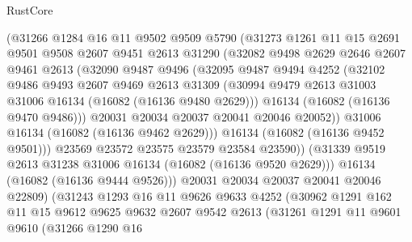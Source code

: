 \begin{lexlean}{RustCore}
\begin{coremodule}
                (@31266
                  @1284
                  @16
                  @11
                  @9502
                  @9509
                  @5790
                  (@31273
                    @1261
                    @11
                    @15
                    @2691
                    @9501
                    @9508
                    @2607
                    @9451
                    @2613
                    @31290
                    (@32082
                      @9498
                      @2629
                      @2646
                      @2607
                      @9461
                      @2613
                      (@32090
                        @9487
                        @9496
                        (@32095
                          @9487
                          @9494
                          @4252
                          (@32102
                            @9486
                            @9493
                            @2607
                            @9469
                            @2613
                            @31309
                            (@30994 @9479 @2613 @31003 @31006 @16134 (@16082 (@16136 @9480 @2629)))
                            @16134
                            (@16082 (@16136 @9470 @9486)))
                          @20031
                          @20034
                          @20037
                          @20041
                          @20046
                          @20052))
                      @31006
                      @16134
                      (@16082 (@16136 @9462 @2629)))
                    @16134
                    (@16082 (@16136 @9452 @9501)))
                  @23569
                  @23572
                  @23575
                  @23579
                  @23584
                  @23590))
              (@31339 @9519 @2613 @31238 @31006 @16134 (@16082 (@16136 @9520 @2629)))
              @16134
              (@16082 (@16136 @9444 @9526)))
            @20031
            @20034
            @20037
            @20041
            @20046
            @22809)
          (@31243
            @1293
            @16
            @11
            @9626
            @9633
            @4252
            (@30962
              @1291
              @162
              @11
              @15
              @9612
              @9625
              @9632
              @2607
              @9542
              @2613
              (@31261
                @1291
                @11
                @9601
                @9610
                (@31266
                  @1290
                  @16

\end{coremodule}
\end{lexlean}
